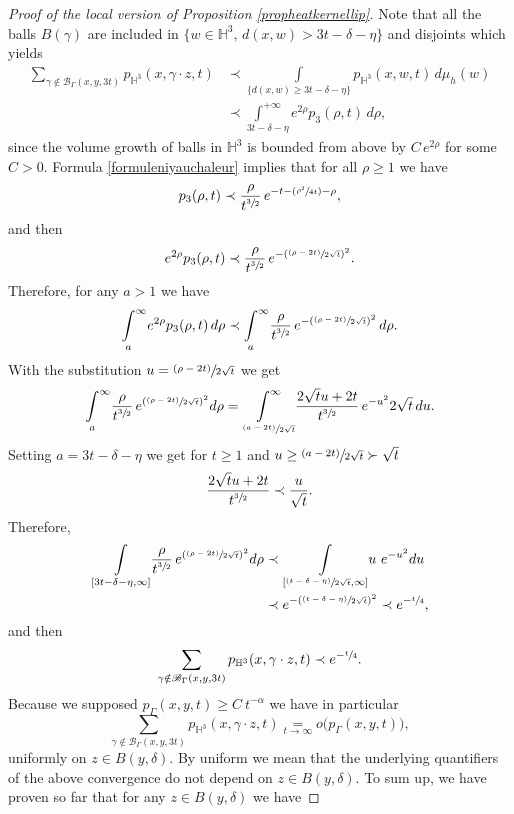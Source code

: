 \documentclass[10pt]{amsart}
\let\mathcal\mathscr
\newcommand{\Psfrac}[2]{(\sfrac{#1}{#2})}
\newcommand{\psfrac}[2]{\sfrac{(#1)}{#2}}
\theoremstyle{plain}
\theoremstyle{definition}
\newcommand{\HH}{\mathbb{H}}
\newcommand{\inte}[1]{\underset{#1}{\int}}
\newcommand{\somme}[1]{\sum_{#1}}
\begin{document}
\begin{proof}[Proof of the local version of Proposition \ref{propheatkernellip}]
Note that all the balls $B(\gamma)$ are included in $ \{ w \in \HH^3, \,d(x,w) > 3t - \delta - \eta \}$ and disjoints which yields
\begin{align*}
\somme{\gamma \notin \mathcal{B}_{\Gamma}(x,y,3t)} p_{\HH^3}(x, \gamma \cdot z,t)
& \prec \inte{ \{ d(x,w) \ge 3t - \delta - \eta \} } p_{\HH^3}(x,w,t) \,d\mu_h(w)\\
& \prec \underset{{3t - \delta - \eta}}{\int^{+ \infty}} e^{2\rho} p_{3}(\rho,t) \,d \rho,
\end{align*}
since the volume growth of balls in $\HH^3$ is bounded from above by $C \, e^{2\rho}$ for some $C > 0$. Formula \eqref{formuleniyauchaleur} implies that for all $\rho \ge 1$ we have
\begin{equation*}
p_{3}(\rho,t) \prec \frac{\rho}{t^{\sfrac{3}{2}}}\, e^{- t - \Psfrac{\rho^2}{4t} - \rho},
\end{equation*}
and then
\[
e^{2 \rho} p_{3}(\rho,t) \prec \frac{\rho}{t^{\sfrac{3}{2}}}\, e^{ - (\psfrac{\rho - 2t}{2 \sqrt{t}})^2}.
\]
Therefore, for any $a > 1$ we have
\[
\inte{a}^{\infty} e^{2 \rho} p_{3}(\rho,t) \,d \rho \prec \inte{a}^{\infty} \frac{\rho}{t^{\sfrac{3}{2}}} \, e^{ -(\psfrac{\rho - 2t}{2 \sqrt{t}})^2}\,d \rho.
\]
With the substitution $ u = \psfrac{\rho - 2t}{2 \sqrt{t}} $ we get
\[
\inte{a}^{\infty} \frac{\rho}{t^{\sfrac{3}{2}}} \, e^{(\psfrac{\rho - 2t}{2 \sqrt{t}})^2} d \rho = \underset{\psfrac{a - 2t}{2 \sqrt{t}}}{\int^{\infty}} \frac{ 2 \sqrt{t} u + 2t }{t^{\sfrac{3}{2}}} \, e^{ - u^2 } 2 \sqrt{t} \,d u.
\]
Setting $a = 3t - \delta - \eta$ we get for $t \ge 1$ and $u \ge \psfrac{a - 2t}{2 \sqrt{t}} \succ \sqrt{t} $
\[
\frac{ 2 \sqrt{t} u + 2t }{t^{\sfrac{3}{2}}} \prec \frac{u}{\sqrt{t}}.
\]
Therefore,
\begin{align*}
\inte{[3t - \delta - \eta, \infty]} \frac{\rho}{t^{\sfrac{3}{2}}} \, e^{(\psfrac{\rho - 2t}{2 \sqrt{t}})^2} d \rho & \prec \inte{[\psfrac{t - \delta - \eta}{2 \sqrt{t}}, \infty]} u \ e^{ - u^2 } d u\\
& \prec e^{ -(\psfrac{t - \delta - \eta}{2 \sqrt{t}})^2 } \prec e^{ - \sfrac{t }{4} },
\end{align*}
and then
\[
\somme{\gamma \notin \mathcal{B}_{\Gamma}(x,y,3t)} p_{\HH^3}(x, \gamma \cdot z,t) \prec e^{ - \sfrac{t}{4} }.
\]
Because we supposed $p_{\Gamma}(x,y,t) \ge C \ t^{-\alpha}$ we have in particular
\[
\somme{ \gamma \notin \mathcal{B}_{\Gamma}(x,y,3t) } p_{\HH^3}(x, \gamma \cdot z,t) \underset{t \to \infty}{=} o \bigl(p_{\Gamma}(x,y,t) \bigr),
\]
uniformly on $z \in B(y,\delta)$. By uniform we mean that the underlying quantifiers of the above convergence do not depend on $z \in B(y, \delta)$. To sum up, we have proven so far that for any $z \in B(y, \delta)$ we have

\end{proof}
\end{document}
